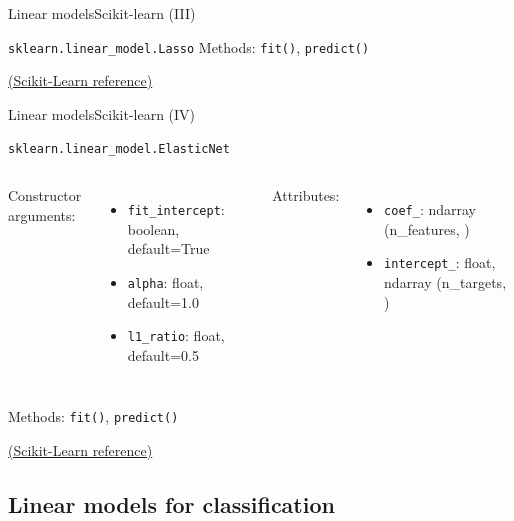\documentclass[10pt,compress]{beamer} %
\begin{document}
{\begin{frame}{Linear models}{Scikit-learn (III)}
\begin{exampleblock}{\texttt{sklearn.linear\_model.Lasso}}
            Methods: \texttt{fit()}, \texttt{predict()}
        \end{exampleblock}

        \medskip
        \centering \href{https://scikit-learn.org/stable/modules/generated/sklearn.linear_model.Lasso.html}{(Scikit-Learn reference)}
    \end{frame}

    \begin{frame}{Linear models}{Scikit-learn (IV)}
        \begin{exampleblock}{\texttt{sklearn.linear\_model.ElasticNet}}
         \medskip

         \begin{columns}[T]
                Constructor arguments:
                \begin{itemize}
                    \item \texttt{fit\_intercept}: boolean, default=True
                    \item \texttt{alpha}: float, default=1.0
                    \item \texttt{l1\_ratio}: float, default=0.5
                \end{itemize}

                Attributes:
                \begin{itemize}
                    \item \texttt{coef\_}:  ndarray (n\_features, )
                    \item \texttt{intercept\_}:  float, ndarray (n\_targets, )
                \end{itemize}
            \end{columns}

            \medskip

            Methods: \texttt{fit()}, \texttt{predict()}
        \end{exampleblock}

        \medskip
        \centering \href{https://scikit-learn.org/stable/modules/generated/sklearn.linear_model.ElasticNet.html}{(Scikit-Learn reference)}
    \end{frame}
}{}


\subsection{Linear models for classification}
\end{document}
